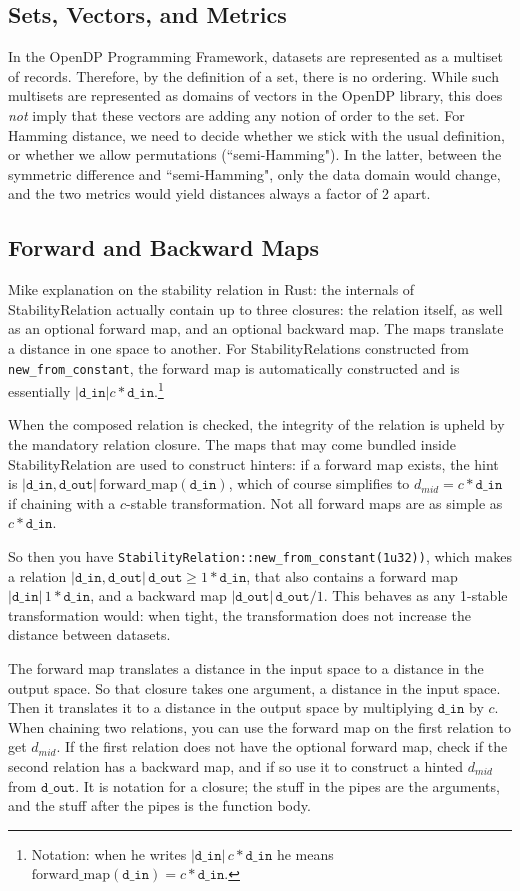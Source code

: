 \documentclass[11pt,a4paper]{article}
\theoremstyle{definition}
\newcommand{\din}{\texttt{d\_in}}
\newcommand{\dout}{\texttt{d\_out}}
\begin{document}
\subsection{Sets, Vectors, and Metrics}
In the OpenDP Programming Framework, datasets are represented as a multiset of records. Therefore, by the definition of a set, there is no ordering. While such multisets are represented as domains of vectors in the OpenDP library, this does \textit{not} imply that these vectors are adding any notion of order to the set. For Hamming distance, we need to decide whether we stick with the usual definition, or whether we allow permutations (``semi-Hamming"). In the latter, between the symmetric difference and ``semi-Hamming", only the data domain would change, and the two metrics would yield distances always a factor of 2 apart.

\subsection{Forward and Backward Maps}
Mike explanation on the stability relation in Rust: the internals of StabilityRelation actually contain up to three closures: the relation itself, as well as an optional forward map, and an optional backward map. The maps translate a distance in one space to another. For StabilityRelations constructed from \texttt{new\_from\_constant}, the forward map is automatically constructed and is essentially $|\din| c * \din$.\footnote{Notation: when he writes $|\din| \, c * \din$ he means $\textrm{forward\_map}(\din) = c * \din$.}

When the composed relation is checked, the integrity of the relation is upheld by the mandatory relation closure. The maps that may come bundled inside StabilityRelation are used to construct hinters: if a forward map exists, the hint is $|\din, \dout| \, \textrm{forward\_map}(\din)$, which of course simplifies to $d_{mid} = c * \din$ if chaining with a $c$-stable transformation. Not all forward maps are as simple as $c * \din$.

So then you have \texttt{StabilityRelation::new\_from\_constant(1u32))}, which makes a relation $|\din, \dout| \, \dout \geq 1 * \din$, that also contains a forward map $|\din|\, 1 * \din$, and a backward map $|\dout| \, \dout / 1$. This behaves as any 1-stable transformation would: when tight, the transformation does not increase the distance between datasets.


The forward map translates a distance in the input space to a distance in the output space. So that closure takes one argument, a distance in the input space. Then it translates it to a distance in the output space by multiplying $\din$ by $c$. When chaining two relations, you can use the forward map on the first relation to get $d_{mid}$. If the first relation does not have the optional forward map, check if the second relation has a backward map, and if so use it to construct a hinted $d_{mid}$ from $\dout$. It is notation for a closure; the stuff in the pipes are the arguments, and the stuff after the pipes is the function body.
\end{document}
